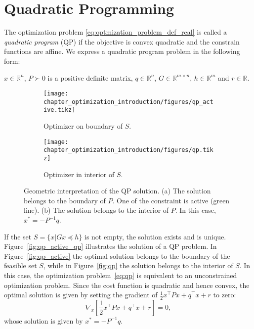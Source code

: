 \section{Quadratic Programming\label{sec:qp}}
The optimization problem \eqref{eq:optmization_problem_def_real} is called a \emph{quadratic program} (QP) if the objective is convex quadratic and the constrain functions are affine. We express a quadratic program problem in the following form:
$x\in\mathbb{R}^n$, $P \succ 0$ is a positive definite matrix, $q\in \mathbb{R}^n$, $G\in \mathbb{R}^{m \times n}$, $h\in \mathbb{R}^m$ and $r\in\mathbb{R}$.
\begin{figure}[t]
\centering
    \begin{subfigure}[b]{0.48\textwidth}
        \centering
        \texttt{[image: chapter\_optimization\_introduction/figures/qp\_active.tikz]}
        \caption{Optimizer on boundary of $S$.}
        \label{fig:qp_active}
    \end{subfigure}
    \hfill
    \begin{subfigure}[b]{0.48\textwidth}
        \centering
        \texttt{[image: chapter\_optimization\_introduction/figures/qp.tikz]}
        \caption{Optimizer in interior of $S$.}
        \label{fig:qp}
    \end{subfigure}
	\caption[Solution of a QP problem]{Geometric interpretation of the QP solution. (a) The solution belongs to the boundary of $P$. One of the constraint is active (green line). (b) The solution belongs to the interior of $P$. In this case, $x^* = -P^{-1} q$.}
	\label{fig:qp_active_qp}
\end{figure}
If the set $S = \{x | G x \preceq h\}$ is not empty, the solution exists and is unique. 
Figure~\eqref{fig:qp_active_qp} illustrates the solution of a QP problem. In Figure~\eqref{fig:qp_active} the optimal solution belongs to the boundary of the feasible set $S$, while in Figure~\eqref{fig:qp} the solution belongs to the interior of $S$. In this case, the optimization problem~\eqref{eq:qp} is equivalent to an unconstrained optimization problem. Since the cost function is quadratic and hence convex, the optimal solution is given by setting the gradient of 
$\frac{1}{2} x^\top P x + q^\top x + r$ to zero:
\begin{equation}
    \nabla_x \left[\frac{1}{2} x^\top P x + q^\top x + r \right] = 0,
\end{equation}
whose solution is given by $x^* = -P^{-1} q$.

